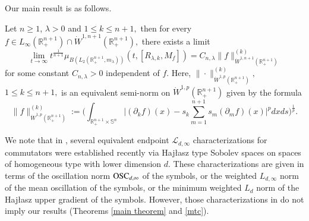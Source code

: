 \documentclass[12pt]{amsart}
\begin{document}
Our  main result is as follows.
\begin{theorem}\label{mtc} Let $n\geq1$, $\lambda>0$ and $1\leq k\leq n+1,$ then for every $f\in L_{\infty}(\mathbb{R}^{n+1}_+)\cap\dot{W}^{1,n+1}(\mathbb{R}^{n+1}_+),$ there exists a limit
$$\lim_{t\to\infty}t^{\frac1{n+1}}\mu_{B(L_2(\mathbb{R}^{n+1}_+,m_{\lambda}))}(t,[R_{\lambda,k},M_f])=C_{n,\lambda}\|f\|_{\dot{W}^{1,n+1}(\mathbb{R}_+^{n+1})}^{(k)}$$
for some constant $C_{n,\lambda}>0$ independent of $f.$ Here, $\|\cdot\|_{\dot{W}^{1,p}(\mathbb{R}_+^{n+1})}^{(k)},$ $1\leq k\leq n+1,$ is an equivalent semi-norm on $\dot{W}^{1,p}(\mathbb{R}_+^{n+1})$ given by the formula
$$\|f\|_{\dot{W}^{1,p}(\mathbb{R}_+^{n+1})}^{(k)}:=\Big(\int_{\mathbb{R}^{n+1}_+\times\mathbb{S}^n}\Big|(\partial_kf)(x)-s_k\sum_{m=1}^{n+1}s_m(\partial_mf)(x)\Big|^{p}dxds\Big)^{\frac1p}.$$
\end{theorem}
{\color{blue}\begin{remark}
We note that in \cite{HRpreprint}, several equivalent endpoint $\mathcal{L}_{d,\infty}$ characterizations for commutators were established recently via Haj\l asz type Sobolev spaces on spaces of homogeneous type with lower dimension $d$.
These characterizations are given in terms of the oscillation norm ${\rm OSC}_{d,\infty}$ of the symbols, or the weighted $L_{d,\infty}$ norm of the mean oscillation of the symbols, or the minimum weighted $L_d$ norm of the Haj\l asz upper gradient of the symbols. However, those
characterizations in \cite{HRpreprint} do not imply our results (Theorems \ref{main theorem} and \ref{mtc}).
\end{remark}}
\end{document}
